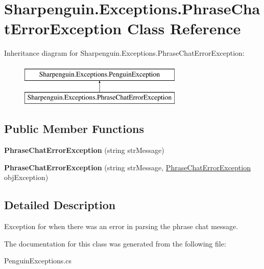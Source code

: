 \hypertarget{classSharpenguin_1_1Exceptions_1_1PhraseChatErrorException}{\section{\-Sharpenguin.\-Exceptions.\-Phrase\-Chat\-Error\-Exception \-Class \-Reference}
\label{classSharpenguin_1_1Exceptions_1_1PhraseChatErrorException}
}
\-Inheritance diagram for \-Sharpenguin.\-Exceptions.\-Phrase\-Chat\-Error\-Exception\-:\begin{figure}[H]
\begin{center}
\leavevmode
\includegraphics[height=2.000000cm]{classSharpenguin_1_1Exceptions_1_1PhraseChatErrorException}
\end{center}
\end{figure}
\subsection*{\-Public \-Member \-Functions}
\begin{DoxyCompactItemize}
\item 
\hypertarget{classSharpenguin_1_1Exceptions_1_1PhraseChatErrorException_a358dfb96b642ea8490c016132052bf0e}{{\bfseries \-Phrase\-Chat\-Error\-Exception} (string str\-Message)}\label{classSharpenguin_1_1Exceptions_1_1PhraseChatErrorException_a358dfb96b642ea8490c016132052bf0e}

\item 
\hypertarget{classSharpenguin_1_1Exceptions_1_1PhraseChatErrorException_aef532df77cc555e2b985336ea4fea714}{{\bfseries \-Phrase\-Chat\-Error\-Exception} (string str\-Message, \hyperlink{classSharpenguin_1_1Exceptions_1_1PhraseChatErrorException}{\-Phrase\-Chat\-Error\-Exception} obj\-Exception)}\label{classSharpenguin_1_1Exceptions_1_1PhraseChatErrorException_aef532df77cc555e2b985336ea4fea714}

\end{DoxyCompactItemize}


\subsection{\-Detailed \-Description}
\-Exception for when there was an error in parsing the phrase chat message. 

\-The documentation for this class was generated from the following file\-:\begin{DoxyCompactItemize}
\item 
\-Penguin\-Exceptions.\-cs\end{DoxyCompactItemize}
